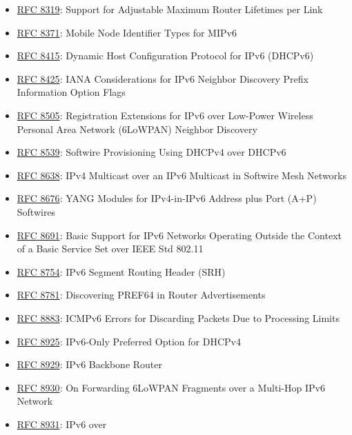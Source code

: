 \documentclass[
]{article}
\begin{document}
\begin{itemize}
\item
  \href{https://www.rfc-editor.org/info/rfc8319}{RFC 8319}: Support for
  Adjustable Maximum Router Lifetimes per Link
\item
  \href{https://www.rfc-editor.org/info/rfc8371}{RFC 8371}: Mobile Node
  Identifier Types for MIPv6
\item
  \href{https://www.rfc-editor.org/info/rfc8415}{RFC 8415}: Dynamic Host
  Configuration Protocol for IPv6 (DHCPv6)
\item
  \href{https://www.rfc-editor.org/info/rfc8425}{RFC 8425}: IANA
  Considerations for IPv6 Neighbor Discovery Prefix Information Option
  Flags
\item
  \href{https://www.rfc-editor.org/info/rfc8505}{RFC 8505}: Registration
  Extensions for IPv6 over Low-Power Wireless Personal Area Network
  (6LoWPAN) Neighbor Discovery
\item
  \href{https://www.rfc-editor.org/info/rfc8539}{RFC 8539}: Softwire
  Provisioning Using DHCPv4 over DHCPv6
\item
  \href{https://www.rfc-editor.org/info/rfc8638}{RFC 8638}: IPv4
  Multicast over an IPv6 Multicast in Softwire Mesh Networks
\item
  \href{https://www.rfc-editor.org/info/rfc8676}{RFC 8676}: YANG Modules
  for IPv4-in-IPv6 Address plus Port (A+P) Softwires
\item
  \href{https://www.rfc-editor.org/info/rfc8691}{RFC 8691}: Basic
  Support for IPv6 Networks Operating Outside the Context of a Basic
  Service Set over IEEE Std 802.11
\item
  \href{https://www.rfc-editor.org/info/rfc8754}{RFC 8754}: IPv6 Segment
  Routing Header (SRH)
\item
  \href{https://www.rfc-editor.org/info/rfc8781}{RFC 8781}: Discovering
  PREF64 in Router Advertisements
\item
  \href{https://www.rfc-editor.org/info/rfc8883}{RFC 8883}: ICMPv6
  Errors for Discarding Packets Due to Processing Limits
\item
  \href{https://www.rfc-editor.org/info/rfc8925}{RFC 8925}: IPv6-Only
  Preferred Option for DHCPv4
\item
  \href{https://www.rfc-editor.org/info/rfc8929}{RFC 8929}: IPv6
  Backbone Router
\item
  \href{https://www.rfc-editor.org/info/rfc8930}{RFC 8930}: On
  Forwarding 6LoWPAN Fragments over a Multi-Hop IPv6 Network
\item
  \href{https://www.rfc-editor.org/info/rfc8931}{RFC 8931}: IPv6 over

\end{itemize}
\end{document}
